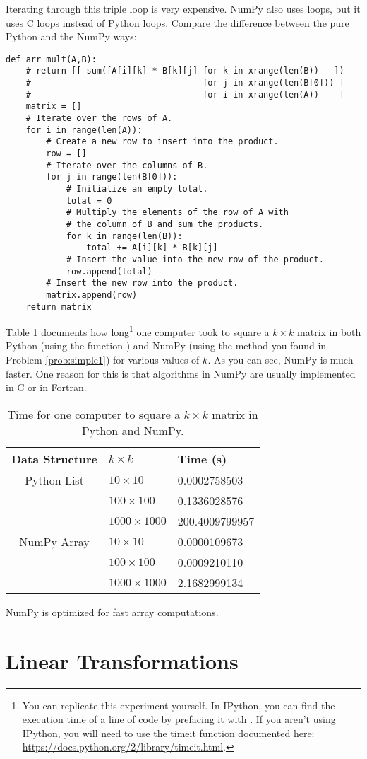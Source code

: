 Iterating through this triple  loop is very expensive.
NumPy also uses loops, but it uses C loops instead of Python loops.
Compare the difference between the pure Python and the NumPy ways:

\begin{lstlisting}
def arr_mult(A,B):
    # return [[ sum([A[i][k] * B[k][j] for k in xrange(len(B))   ]) 
    #                                  for j in xrange(len(B[0])) ]
    #                                  for i in xrange(len(A))    ]
    matrix = []
    # Iterate over the rows of A.
    for i in range(len(A)):
        # Create a new row to insert into the product.
        row = []
        # Iterate over the columns of B.
        for j in range(len(B[0])):
            # Initialize an empty total.
            total = 0
            # Multiply the elements of the row of A with 
            # the column of B and sum the products.
            for k in range(len(B)):
                total += A[i][k] * B[k][j]
            # Insert the value into the new row of the product. 
            row.append(total)
        # Insert the new row into the product.
        matrix.append(row)
    return matrix
\end{lstlisting}

Table \ref{table:square_times} documents how long\footnote{You can replicate this experiment yourself. In IPython, you can find the execution time of a line of code by prefacing it with .
If you aren't using IPython, you will need
to use the timeit function documented here: \url{https://docs.python.org/2/library/timeit.html}.}
one computer took to square a $k \times k$ matrix in both Python (using the function ) and NumPy (using the method you found in Problem \ref{prob:simple1}) for various values of $k$.
As you can see, NumPy is much faster.
One reason for this is that algorithms in NumPy are usually implemented in C or in Fortran.

\begin{table}
 \begin{tabular}{|c|l|l|} \hline Data Structure & $k\times k$ & Time (s) \\ \hline
 Python List    & $10\times10$  & 0.0002758503 \\
 \cline{2-3}    & $100\times100$    & 0.1336028576 \\
 \cline{2-3}    & $1000\times1000$ & 200.4009799957 \\
\hline \hline
 NumPy Array    & $10\times10$  & 0.0000109673 \\
 \cline{2-3}    & $100\times100$    & 0.0009210110 \\
 \cline{2-3}    & $1000\times1000$ & 2.1682999134 \\
 \hline \end{tabular}
 \caption{Time for one computer to square a $k \times k$ matrix in Python and NumPy.}
\label{table:square_times}
\end{table}
%
NumPy is optimized for fast array computations.


\section*{Linear Transformations} %
